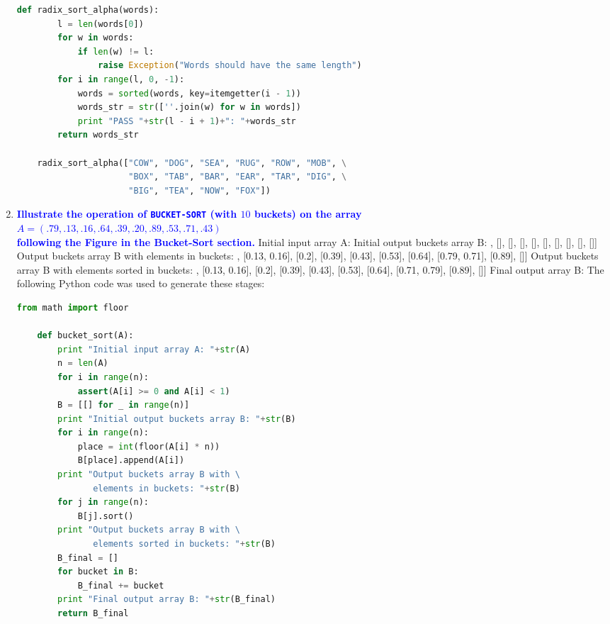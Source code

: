 \documentclass{article}
\begin{document}
\begin{enumerate}
\begin{lstlisting}[language=Python]
    def radix_sort_alpha(words):
        l = len(words[0])
        for w in words:
            if len(w) != l:
                raise Exception("Words should have the same length")
        for i in range(l, 0, -1):
            words = sorted(words, key=itemgetter(i - 1))
            words_str = str([''.join(w) for w in words])
            print "PASS "+str(l - i + 1)+": "+words_str
        return words_str
            
    radix_sort_alpha(["COW", "DOG", "SEA", "RUG", "ROW", "MOB", \
                      "BOX", "TAB", "BAR", "EAR", "TAR", "DIG", \
                      "BIG", "TEA", "NOW", "FOX"])
    \end{lstlisting}

\item \textbf{\textcolor{blue}{Illustrate the operation of {\tt BUCKET-SORT} 
(with $10$ buckets)
on the
array \\ $A=(.79,.13,.16,.64,.39,.20,.89,.53,.71,.43)$ \\  following
the Figure in the Bucket-Sort section.}}
    \newline\newline Initial input array A: 
    \newline [0.79, 0.13, 0.16, 0.64, 0.39, 0.2, 0.89, 0.53, 0.71, 0.43]
    \newline Initial output buckets array B:
    \newline [[], [], [], [], [], [], [], [], [], []]
    \newline Output buckets array B with elements in buckets:
    \newline [[], [0.13, 0.16], [0.2], [0.39], [0.43], [0.53], [0.64], [0.79, 0.71], [0.89], []]
    \newline Output buckets array B with elements sorted in buckets:
    \newline [[], [0.13, 0.16], [0.2], [0.39], [0.43], [0.53], [0.64], [0.71, 0.79], [0.89], []]
    \newline Final output array B:
    \newline [0.13, 0.16, 0.2, 0.39, 0.43, 0.53, 0.64, 0.71, 0.79, 0.89]
    \newline The following Python code was used to generate these stages:
    \begin{lstlisting}[language=Python]
    from math import floor
                 
    def bucket_sort(A):
        print "Initial input array A: "+str(A)
        n = len(A)
        for i in range(n):
            assert(A[i] >= 0 and A[i] < 1)
        B = [[] for _ in range(n)]
        print "Initial output buckets array B: "+str(B)
        for i in range(n):
            place = int(floor(A[i] * n))
            B[place].append(A[i])
        print "Output buckets array B with \
               elements in buckets: "+str(B)
        for j in range(n):
            B[j].sort()
        print "Output buckets array B with \
               elements sorted in buckets: "+str(B)
        B_final = []
        for bucket in B:
            B_final += bucket
        print "Final output array B: "+str(B_final)
        return B_final
        

\end{lstlisting}
\end{enumerate}
\end{document}
